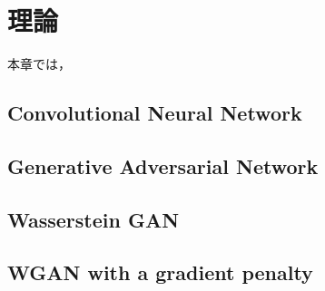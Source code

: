 \documentclass[\homedir/main.tex]{subfiles}
\begin{document}
\setcounter{chapter}{2}
\chapter{理論}\label{chap:theories}
本章では，


\section{Convolutional Neural Network}


\section{Generative Adversarial Network}


\section{Wasserstein GAN}


\section{WGAN with a gradient penalty}


\printBibForSubfiles
\end{document}
